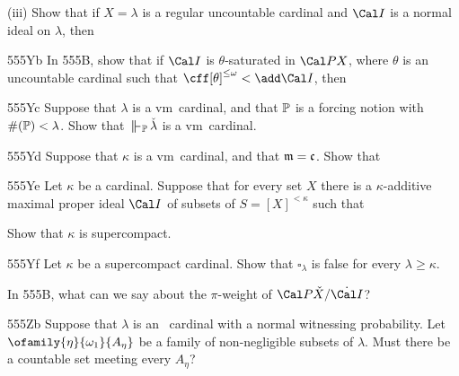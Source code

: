 {\noindent(iii) Show that if $X=\lambda$ is a regular uncountable cardinal
and $\Cal I$ is a normal ideal on $\lambda$, then


\spheader 555Yb
In 555B, show that if $\Cal I$ is $\theta$-saturated in $\Cal PX$,
where $\theta$ is
an uncountable cardinal such that $\cff[\theta]^{\le\omega}<\add\Cal I$,
then


\spheader 555Yc Suppose that $\lambda$ is a \2vm\ cardinal, and that
$\Bbb P$ is a forcing notion with $\#(\Bbb P)<\lambda$.   Show that
$\VVdP\,\check\lambda$ is a \2vm\ cardinal.

\spheader 555Yd Suppose that $\kappa$ is a \2vm\ cardinal, and that
$\frak m=\frak c$.   Show that


\spheader 555Ye Let $\kappa$ be a cardinal.   Suppose that
for every set $X$
there is a $\kappa$-additive maximal proper ideal $\Cal I$ of subsets of
$S=[X]^{<\kappa}$ such that


\noindent Show that $\kappa$ is supercompact.

\spheader 555Yf Let $\kappa$ be a supercompact cardinal.   Show that
$\square_{\lambda}$ is false for every $\lambda\ge\kappa$.
}%

In 555B, what can we say about the $\pi$-weight of
$\Cal P\check X/\dot{\Cal I}$?

\spheader 555Zb
Suppose that $\lambda$ is an \am\ cardinal with a normal witnessing
probability.   Let $\ofamily{\eta}{\omega_1}{A_{\eta}}$ be a
family of non-negligible subsets of $\lambda$.   Must there be a countable
set meeting every $A_{\eta}$?


